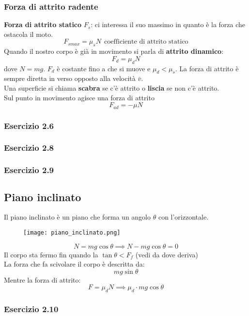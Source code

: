 \documentclass[../../main.tex]{subfiles}
\begin{document}
\subsubsection{Forza di attrito radente}
\textbf{Forza di attrito statico} $F_s$: ci interessa il suo massimo in quanto è la forza che ostacola il moto. 
\[
    F_{s max} = \mu_s N \ \ \text{coefficiente di attrito statico}
\]
Quando il nostro corpo è già in movimento si parla di \textbf{attrito dinamico}:
\[
    F_d = \mu_d N
\]
dove $N = mg$. $F_d$ è costante fino a che si muove e $\mu_d < \mu_s$. La forza di attrito è sempre diretta in verso opposto alla velocità $\bar v$.\\
Una superficie si chiama \textbf{scabra} se c'è attrito o \textbf{liscia} se non c'è attrito.\\
Sul punto in movimento agisce una forza di attrito 
\[
   F_{ad} = -\mu N 
\]

\subsubsection{Esercizio 2.6}

\subsubsection{Esercizio 2.8}

\subsubsection{Esercizio 2.9}

\subsection{Piano inclinato}
Il piano inclinato è un piano che forma un angolo $\theta$ con l'orizzontale.
\begin{figure}[H]
    \centering
    \texttt{[image: piano\_inclinato.png]}
\end{figure}
\[
    N = mg\cos\theta \implies N - mg\cos\theta = 0
\]
Il corpo sta fermo fin quando la $\tan\theta < F_f$ (vedi da dove deriva)\\
La forza che fa scivolare il corpo è descritta da:
\[
    mg\sin\theta
\]
Mentre la forza di attrito:
\[
    F = \mu_d N \implies \mu_d \cdot mg\cos\theta
\]

\subsubsection{Esercizio 2.10}
\end{document}
